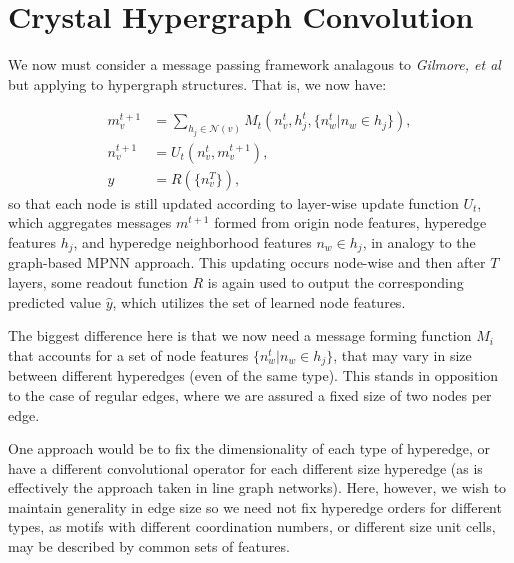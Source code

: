 \documentclass[10pt,a4paper]{article}
\begin{document}
\section{Crystal Hypergraph Convolution}

We now must consider a message passing framework analagous to \textit{Gilmore, et al} \cite{mpnn} but applying to hypergraph structures. That is, we now have:

\begin{align*}
m_v^{t+1}&=\sum_{h_j\in \mathcal{N}(v)} M_t(n_v^{t},h_j^{t},\lbrace n_w^t \vert n_w \in h_j \rbrace),\\
n_v^{t+1}&=U_t(n_v^t,m_v^{t+1}),\\
\hat{y}&=R(\lbrace n_v^T\rbrace),
\end{align*}
so that each node is still updated according to layer-wise update function $U_t$, which aggregates messages $m^{t+1}$ formed from origin node features, hyperedge features $h_j$, and hyperedge neighborhood features $n_w \in h_j$, in analogy to the graph-based MPNN approach. This updating occurs node-wise and then after $T$ layers, some readout function $R$ is again used to output the corresponding predicted value $\hat{y}$, which utilizes the set of learned node features.


  
The biggest difference here is that we now need a message forming function $M_i$ that accounts for a set of node features $\lbrace n_w^t \vert n_w \in h_j \rbrace$, that may vary in size between different hyperedges (even of the same type). This stands in opposition to the case of regular edges, where we are assured a fixed size of two nodes per edge. 

One approach would be to fix the dimensionality of each type of hyperedge, or have a different convolutional operator for each different size hyperedge (as is effectively the approach taken in line graph networks). Here, however, we wish to maintain generality in edge size so we need not fix hyperedge orders for different types, as motifs with different coordination numbers, or different size unit cells, may be described by common sets of features.
\end{document}
